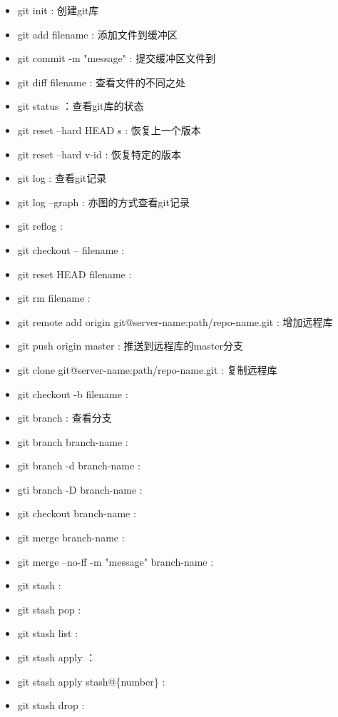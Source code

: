 \documentclass[12pt,twoside]{report}
\begin{document}
\begin{leftbar}
    \begin{itemize}
        \item git init : 创建git库
        \item git add filename : 添加文件到缓冲区
        \item git commit -m "message" : 提交缓冲区文件到
        \item git diff filename : 查看文件的不同之处
        \item git status ：查看git库的状态
        \item git reset --hard HEAD s$\hat{}$ : 恢复上一个版本
        \item git reset --hard v-id : 恢复特定的版本
        \item git log : 查看git记录
        \item git log --graph : 亦图的方式查看git记录
        \item git reflog :  
        \item git checkout -- filename :
        \item git reset HEAD filename :
        \item git rm filename :
        \item git remote add origin git@server-name:path/repo-name.git : 增加远程库
        \item git push origin master : 推送到远程库的master分支
        \item git clone git@server-name:path/repo-name.git : 复制远程库
        \item git checkout -b filename : 
        \item git branch : 查看分支
        \item git branch branch-name :
        \item git branch -d branch-name :
        \item gti branch -D branch-name :
        \item git checkout branch-name :
        \item git merge branch-name :
        \item git merge --no-ff -m "message" branch-name :
        \item git stash :
        \item git stash pop :
        \item git stash list :
        \item git stash apply ：
        \item git stash apply stash@\{number\} :
        \item git stash drop :

\end{itemize}
\end{leftbar}
\end{document}
